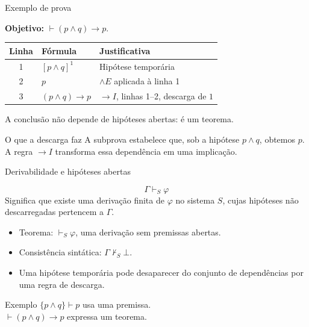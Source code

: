 \documentclass[10pt,aspectratio=169]{beamer}
\newcommand{\dest}[1]{\alert{#1}}
\begin{document}
\begin{frame}{Exemplo de prova}

\textbf{Objetivo:} $\vdash (p\land q)\to p$.
\begin{center}
\renewcommand{\arraystretch}{1.5}
\begin{tabular}{cll}
\toprule
Linha & Fórmula & Justificativa\\\midrule
1 & $[p\land q]^1$ & Hipótese temporária\\
2 & $p$ & $\land E$ aplicada à linha 1\\
3 & $(p\land q)\to p$ & $\to I$, linhas 1--2, descarga de $1$\\
\bottomrule
\end{tabular}\par
\end{center}
A conclusão não depende de hipóteses abertas: é um \dest{teorema}.
\begin{block}{O que a descarga faz}
A subprova estabelece que, sob a hipótese $p\land q$, obtemos $p$.
A regra $\to I$ transforma essa dependência em uma implicação.
\end{block}
\end{frame}



\begin{frame}{Derivabilidade e hipóteses abertas}

\[\Gamma\vdash_S\varphi\]
Significa que existe uma derivação finita de $\varphi$ no sistema $S$, cujas hipóteses não descarregadas pertencem a $\Gamma$.
\begin{itemize}
\item \dest{Teorema}: $\vdash_S\varphi$, uma derivação sem premissas abertas.
\item \dest{Consistência sintática}: $\Gamma\nvdash_S\bot$.
\item Uma hipótese temporária pode desaparecer do conjunto de dependências por uma regra de descarga.
\end{itemize}
\begin{block}{Exemplo}
$\{p\land q\}\vdash p$ usa uma premissa.\\
$\vdash(p\land q)\to p$ expressa um teorema.
\end{block}
\end{frame}
\end{document}
